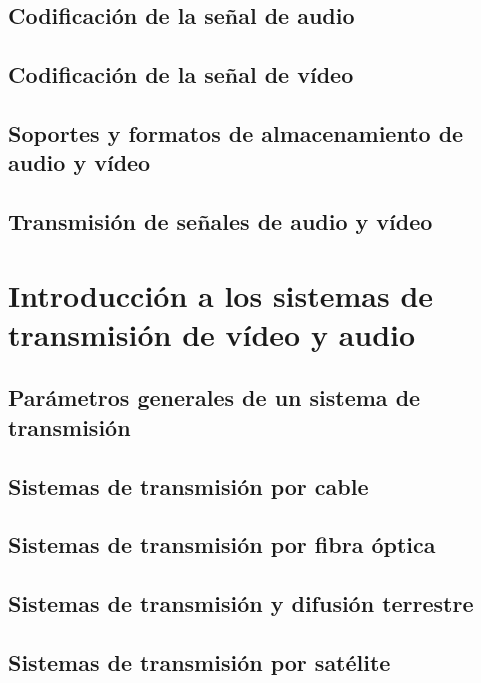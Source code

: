 \documentclass[10pt]{book}
\begin{document}
\section{Codificación de la señal de audio}

\section{Codificación de la señal de vídeo}

\section{Soportes y formatos de almacenamiento de audio y vídeo}

\section{Transmisión de señales de audio y vídeo}



\chapter{Introducción a los sistemas de transmisión de vídeo y audio}

\section{Parámetros generales de un sistema de transmisión}

\section{Sistemas de transmisión por cable}

\section{Sistemas de transmisión por fibra óptica}

\section{Sistemas de transmisión y difusión terrestre}

\section{Sistemas de transmisión por satélite}
\end{document}
